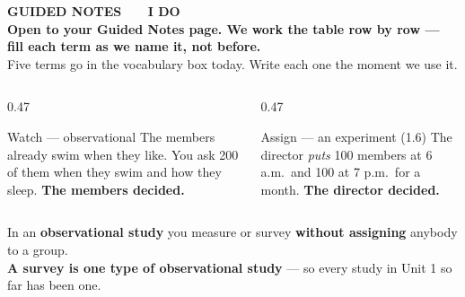 \documentclass[aspectratio=169, 11pt]{beamer}
\newcommand{\redink}[1]{{\color{redacc}\bfseries #1}}
\begin{document}
{
\begin{frame}[plain]
  \vspace{1.8cm}\hspace{0.8cm}%
  \begin{minipage}{0.86\textwidth}
    {\color{goldacc}\bfseries\small GUIDED NOTES \ \textbullet\ \ I DO}\\[0.7cm]
    {\color{white}\bfseries\Large Open to your Guided Notes page. We work the table row by
    row --- fill each term as we name it, not before.}\\[0.9cm]
    {\color{frostmid}\small Five terms go in the vocabulary box today. Write each one the
    moment we use it.}
  \end{minipage}
\end{frame}
}

\begin{frame}[t, plain]
  \vspace{4pt}
  \begin{columns}[t]
    \begin{column}{0.47\textwidth}
      \begin{block}{Watch --- observational}
        The members already swim when they like. You ask 200 of them when they swim and how
        they sleep. \textbf{The members decided.}
      \end{block}
    \end{column}
    \begin{column}{0.47\textwidth}
      \begin{block}{Assign --- an experiment (1.6)}
        The director \emph{puts} 100 members at 6 a.m.\ and 100 at 7 p.m.\ for a month.
        \textbf{The director decided.}
      \end{block}
    \end{column}
  \end{columns}
  \vspace{10pt}
  \begin{center}
    {\large In an \textbf{observational study} you measure or survey \redink{without assigning}
    anybody to a group.}\\[6pt]
    {\small\color{slate} \textbf{A survey is one type of observational study} --- so every
    study in Unit 1 so far has been one.}
  \end{center}
\end{frame}
\end{document}

